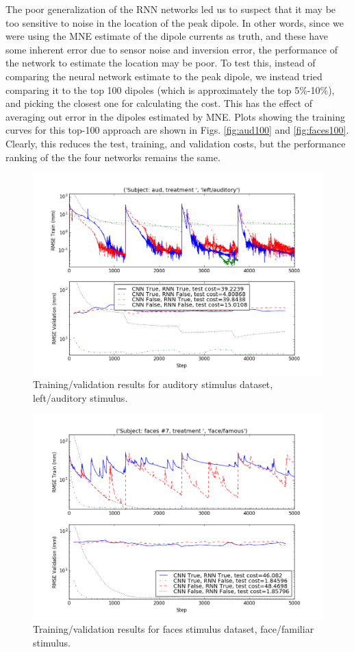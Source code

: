 \documentclass[journal,12pt,onecolumn,draftclsnofoot]{IEEEtran}
\begin{document}
The poor generalization of the RNN networks led us to suspect that it may be too sensitive to noise in the location of the peak dipole. In other words, since we were using the MNE estimate of the dipole currents as truth, and these have some inherent error due to sensor noise and inversion error, the performance of the network to estimate the location may be poor. To test this, instead of comparing the neural network estimate to the peak dipole, we instead tried comparing it to the top 100 dipoles (which is approximately the top 5\%-10\%), and picking the closest one for calculating the cost. This has the effect of averaging out error in the dipoles estimated by MNE. Plots showing the training curves for this top-100 approach are shown in Figs. \ref{fig:aud100} and \ref{fig:faces100}. Clearly, this reduces the test, training, and validation costs, but the performance ranking of the the four networks remains the same.
\begin{figure}[h!]
\centering
\includegraphics[width=5in]{finalplots/aud1la}
\caption{Training/validation results for auditory stimulus dataset, left/auditory stimulus.}
\label{fig:aud1la}
\end{figure}

\begin{figure}[h!]
\centering
\includegraphics[width=5in]{finalplots/faces1ff}
\caption{Training/validation results for faces stimulus dataset, face/familiar stimulus.}
\label{fig:faces1ff}
\end{figure}
\end{document}
